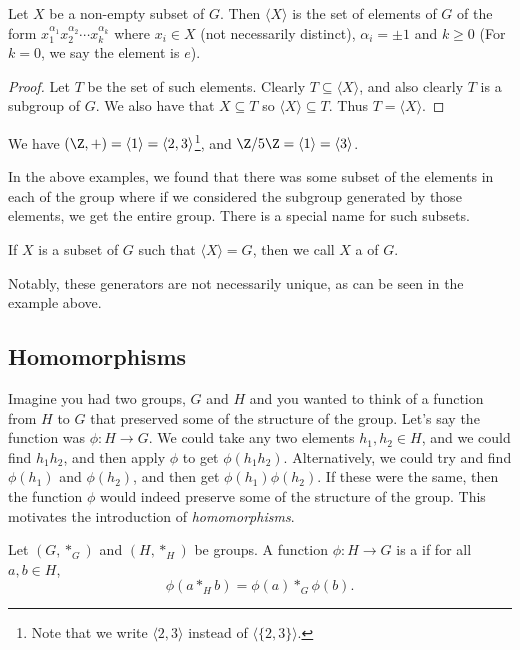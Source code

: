 \documentclass[a4paper]{scrartcl}
\newcommand{\newsection}{\subsection}
\begin{document}
\begin{proposition}
	Let $X$ be a non-empty subset of $G$. Then $\langle X \rangle$ is the set of elements of $G$ of the form 
	$x_1^{\alpha_1} x_2^{\alpha_2} \cdots x_k^{\alpha_k}$ where $x_i \in X$ (not necessarily distinct), $\alpha_i = \pm 1$ and $k \geq 0$
	(For $k = 0$, we say the element is $e$).
\end{proposition}
\begin{proof}
	Let $T$ be the set of such elements. Clearly $T \subseteq \langle X \rangle$, and also clearly $T$ is a subgroup of $G$. We also have that $X \subseteq T$ so $\langle X \rangle \subseteq T$. Thus $T = \langle X \rangle$.
\end{proof}
  
\begin{example}
	We have $(\Z, +) = \langle 1 \rangle = \langle 2, 3 \rangle$\footnote{Note that we write $\langle 2, 3\rangle$ instead of $\langle \{2, 3\} \rangle$.}, and $\Z/5\Z = \langle 1 \rangle = \langle 3 \rangle$.
\end{example}

In the above examples, we found that there was some subset of the elements in each of the group where if we considered the subgroup generated by those elements, we get the entire group.
There is a special name for such subsets.

\begin{definition}[Generators]\label{def:generator}
	If $X$ is a subset of $G$ such that $\langle X \rangle = G$, then we call $X$ a  of $G$.
\end{definition}

Notably, these generators are not necessarily unique, as can be seen in the example above.


\newsection{Homomorphisms}

Imagine you had two groups, $G$ and $H$ and you wanted to think of a function from $H$ to $G$ that preserved some of the structure of the group.
Let's say the function was $\phi : H \rightarrow G$. We could take any two elements $h_1, h_2 \in H$, and we could find $h_1 h_2$, and then apply $\phi$ to get $\phi(h_1 h_2)$.
Alternatively, we could try and find $\phi(h_1)$ and $\phi(h_2)$, and then get $\phi(h_1) \phi(h_2)$. If these were the same, then the function $\phi$ would indeed preserve some of the structure of the group. This motivates the introduction of \emph{homomorphisms}.

\begin{definition}[Homomorphism]
	Let $(G, *_G)$ and $(H, *_H)$ be groups. A function $\phi : H \rightarrow G$ is a  if for all $a, b \in H$,
	$$
	\phi(a *_H b) = \phi(a) *_G \phi(b).
	$$
\end{definition}
\end{document}
